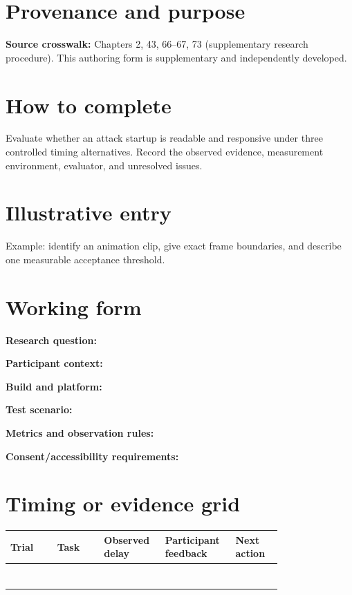 \documentclass[10pt,letterpaper]{article}
\begin{document}
\makedoctitle
\makedocsummary

\section{Provenance and purpose}
\textbf{Source crosswalk:} Chapters 2, 43, 66--67, 73 (supplementary research procedure). This authoring form is supplementary and independently developed.
\section{How to complete}
Evaluate whether an attack startup is readable and responsive under three controlled timing alternatives. Record the observed evidence, measurement environment, evaluator, and unresolved issues. 
\section{Illustrative entry}
Example: identify an animation clip, give exact frame boundaries, and describe one measurable acceptance threshold.
\section{Working form}
\noindent\textbf{Research question:}\quad\hrulefill\par\vspace{10pt}
\noindent\textbf{Participant context:}\quad\hrulefill\par\vspace{10pt}
\noindent\textbf{Build and platform:}\quad\hrulefill\par\vspace{10pt}
\noindent\textbf{Test scenario:}\quad\hrulefill\par\vspace{10pt}
\noindent\textbf{Metrics and observation rules:}\quad\hrulefill\par\vspace{10pt}
\noindent\textbf{Consent/accessibility requirements:}\quad\hrulefill\par\vspace{10pt}\section{Timing or evidence grid}
\begin{longtable}{|p{0.156\linewidth}|p{0.156\linewidth}|p{0.156\linewidth}|p{0.156\linewidth}|p{0.156\linewidth}|}
\hline
\textbf{Trial} & \textbf{Task} & \textbf{Observed delay} & \textbf{Participant feedback} & \textbf{Next action}\\\hline
\endhead
\rule{0pt}{20pt} &  &  &  & \\\hline
\rule{0pt}{20pt} &  &  &  & \\\hline
\rule{0pt}{20pt} &  &  &  & \\\hline
\rule{0pt}{20pt} &  &  &  & \\\hline
\rule{0pt}{20pt} &  &  &  & \\\hline
\rule{0pt}{20pt} &  &  &  & \\\hline
\rule{0pt}{20pt} &  &  &  & \\\hline
\end{longtable}
\end{document}
